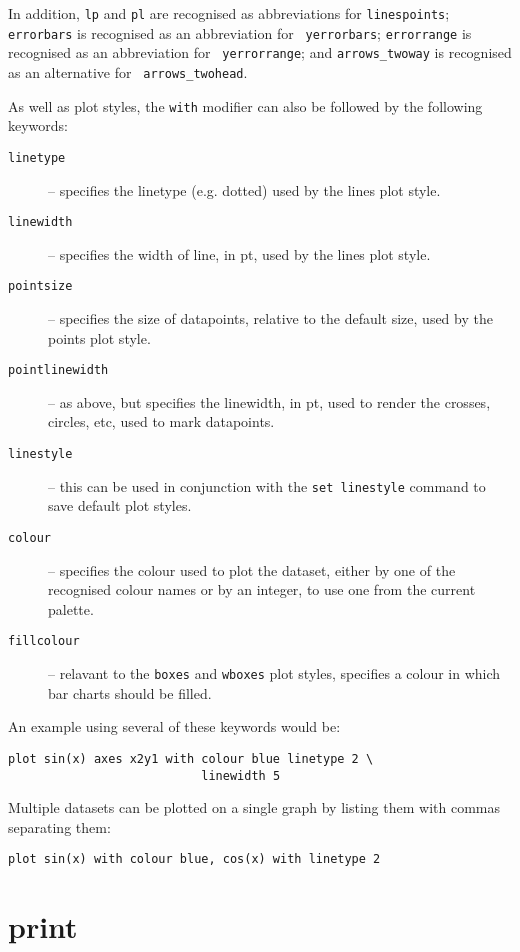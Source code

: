 In addition, {\tt lp} and {\tt pl} are recognised as abbreviations
for {\tt linespoints}; {\tt errorbars} is recognised as an abbreviation for {\tt
yerrorbars}; {\tt errorrange} is recognised as an abbreviation for {\tt
yerrorrange}; and {\tt arrows\_twoway} is recognised as an alternative for {\tt
arrows\_twohead}.

As well as plot styles, the {\tt with} modifier can also be followed by the
following keywords:

\begin{description}
\item[{\tt linetype}] -- specifies the linetype (e.g. dotted) used by the lines plot style. 
\item[{\tt linewidth}] -- specifies the width of line, in pt, used by the lines plot style.
\item[{\tt pointsize}] -- specifies the size of datapoints, relative to the
default size, used by the points plot style. 
\item[{\tt pointlinewidth}] -- as above, but specifies the linewidth, in pt,
used to render the crosses, circles, etc, used to mark datapoints. 
\item[{\tt linestyle}] -- this can be used in conjunction with the {\tt set linestyle} command to save default plot styles. 
\item[{\tt colour}] -- specifies the colour used to plot the dataset, either by
one of the recognised colour names or by an integer,
to use one from the current palette.  \item[{\tt fillcolour}] -- relavant to the
{\tt boxes} and {\tt wboxes} plot
styles, specifies a colour in which bar charts should be filled.
\end{description}

An example using several of these keywords would be:

\begin{verbatim}
plot sin(x) axes x2y1 with colour blue linetype 2 \
                           linewidth 5
\end{verbatim}

Multiple datasets can be plotted on a single graph by listing them with commas
separating them:

\begin{verbatim}
plot sin(x) with colour blue, cos(x) with linetype 2
\end{verbatim}


\section{print}

